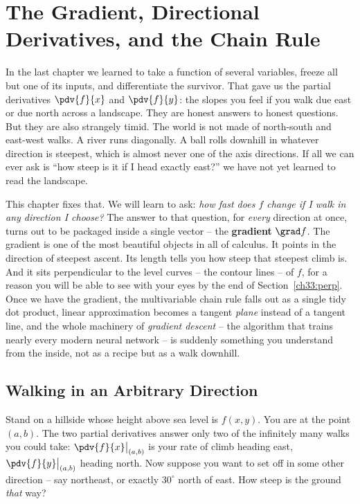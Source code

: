 \chapter{The Gradient, Directional Derivatives, and the Chain Rule}

In the last chapter we learned to take a function of several variables, freeze
all but one of its inputs, and differentiate the survivor. That gave us the
partial derivatives $\pdv{f}{x}$ and $\pdv{f}{y}$: the slopes you feel if you
walk due east or due north across a landscape. They are honest answers to honest
questions. But they are also strangely timid. The world is not made of
north-south and east-west walks. A river runs diagonally. A ball rolls downhill
in whatever direction is steepest, which is almost never one of the axis
directions. If all we can ever ask is ``how steep is it if I head exactly east?''
we have not yet learned to read the landscape.

This chapter fixes that. We will learn to ask: \emph{how fast does $f$ change if I
walk in any direction I choose?} The answer to that question, for \emph{every}
direction at once, turns out to be packaged inside a single vector -- the
\textbf{gradient} $\grad f$. The gradient is one of the most beautiful objects in
all of calculus. It points in the direction of steepest ascent. Its length tells
you how steep that steepest climb is. And it sits perpendicular to the level
curves -- the contour lines -- of $f$, for a reason you will be able to see with
your eyes by the end of Section~\ref{ch33:perp}. Once we have the gradient, the
multivariable chain rule falls out as a single tidy dot product, linear
approximation becomes a tangent \emph{plane} instead of a tangent line, and the
whole machinery of \emph{gradient descent} -- the algorithm that trains nearly
every modern neural network -- is suddenly something you understand from the
inside, not as a recipe but as a walk downhill.

\chapterline

\section{Walking in an Arbitrary Direction}
\label{ch33:directional}

Stand on a hillside whose height above sea level is $f(x,y)$. You are at the
point $(a,b)$. The two partial derivatives answer only two of the infinitely many
walks you could take: $\pdv{f}{x}\big|_{(a,b)}$ is your rate of climb heading
east, $\pdv{f}{y}\big|_{(a,b)}$ heading north. Now suppose you want to set off in
some other direction -- say northeast, or exactly $30^\circ$ north of east. How
steep is the ground \emph{that} way?

